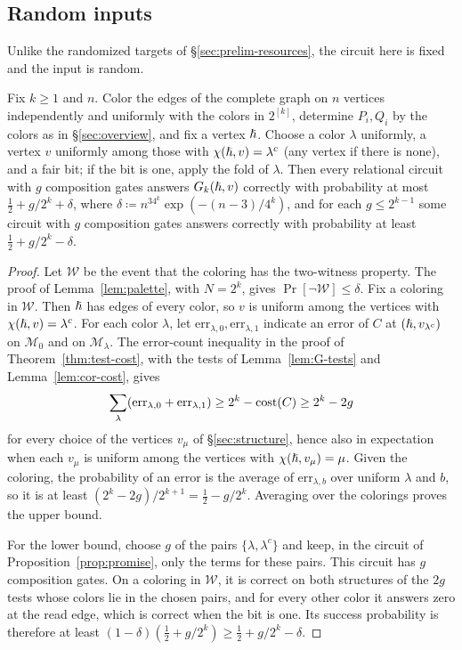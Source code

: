 \subsection{Random inputs}\label{sec:random-inputs}
Unlike the randomized targets of \S\ref{sec:prelim-resources}, the
circuit here is fixed and the input is random.
\begin{corollary}\label{cor:random-inputs}
Fix $k\ge1$ and $n$. Color the edges of the complete graph on $n$
vertices independently and uniformly with the colors in $2^{[k]}$,
determine $P_i,Q_i$ by the colors as in \S\ref{sec:overview}, and
fix a vertex $\hslash$. Choose a color $\lambda$ uniformly, a vertex $v$
uniformly among those with $\chi(\hslash,v)=\lambda^c$ (any vertex if there
is none), and a fair bit; if the bit is one, apply the fold of
$\lambda$. Then every relational circuit with $g$ composition gates
answers $G_k(\hslash,v)$ correctly with probability at most
$\frac12+g/2^k+\delta$,
where $\delta\coloneqq n^34^k\exp(-(n-3)/4^k)$, and for each
$g\le2^{k-1}$ some circuit with $g$ composition gates answers correctly
with probability at least $\frac12+g/2^k-\delta$.
\end{corollary}
\begin{proof}
Let $\mathcal W$ be the event that the coloring has the two-witness
property. The proof of Lemma~\ref{lem:palette}, with $N=2^k$, gives
$\Pr[\lnot\mathcal W]\le\delta$. Fix a coloring in $\mathcal W$. Then
$\hslash$ has edges of every color, so $v$ is uniform among the vertices
with $\chi(\hslash,v)=\lambda^c$. For each color $\lambda$, let
$\mathrm{err}_{\lambda,0},\mathrm{err}_{\lambda,1}$ indicate an error of
$C$ at $(\hslash,v_{\lambda^c})$ on $\mathcal M_0$ and on $\mathcal M_\lambda$.
The error-count inequality in the proof of Theorem~\ref{thm:test-cost},
with the tests of Lemma~\ref{lem:G-tests} and Lemma~\ref{lem:cor-cost},
gives
\[
 \sum_\lambda(\mathrm{err}_{\lambda,0}+\mathrm{err}_{\lambda,1})
 \ge2^k-\operatorname{cost}(C)\ge2^k-2g
\]
for every choice of the vertices $v_\mu$ of \S\ref{sec:structure}, hence
also in expectation when each $v_\mu$ is uniform among the vertices with
$\chi(\hslash,v_\mu)=\mu$. Given the coloring, the probability of
an error is the average of $\mathrm{err}_{\lambda,b}$ over uniform
$\lambda$ and $b$, so it is
at least $(2^k-2g)/2^{k+1}=\frac12-g/2^k$. Averaging over the colorings
proves the upper bound.

For the lower bound, choose $g$ of the pairs $\{\lambda,\lambda^c\}$ and keep, in the
circuit of Proposition~\ref{prop:promise}, only the terms for these pairs.
This circuit has $g$ composition gates. On a coloring in $\mathcal W$, it
is correct on both structures of the $2g$ tests whose colors lie in the
chosen pairs, and for every other color it answers zero at the read
edge, which is correct when the bit is one. Its success probability is
therefore at least $(1-\delta)(\frac12+g/2^k)\ge\frac12+g/2^k-\delta$.
\end{proof}

